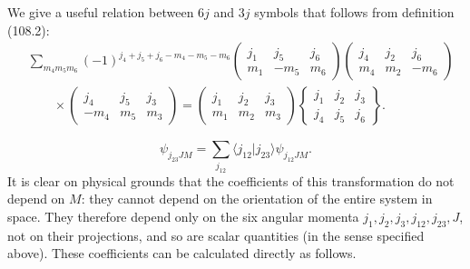 We give a useful relation between $6j$ and $3j$ symbols that follows from definition (108.2):
\begin{equation}
\begin{aligned}
&\sum_{m_4m_5m_6}(-1)^{j_4+j_5+j_6-m_4-m_5-m_6}
\begin{pmatrix}j_1&j_5&j_6\\m_1&-m_5&m_6\end{pmatrix}
\begin{pmatrix}j_4&j_2&j_6\\m_4&m_2&-m_6\end{pmatrix}\\
&\qquad\times\begin{pmatrix}j_4&j_5&j_3\\-m_4&m_5&m_3\end{pmatrix}
=\begin{pmatrix}j_1&j_2&j_3\\m_1&m_2&m_3\end{pmatrix}
\left\{\begin{matrix}j_1&j_2&j_3\\j_4&j_5&j_6\end{matrix}\right\}.
\end{aligned}
\tag{108.4}
\end{equation}





\begin{equation}
 \psi_{j_{23}JM}=\sum_{j_{12}}\langle j_{12}|j_{23}\rangle\psi_{j_{12}JM}.
 \tag{108.5}
\end{equation}
It is clear on physical grounds that the coefficients of this transformation do not depend on $M$: they cannot depend on the orientation of the entire system in space. They therefore depend only on the six angular momenta $j_1,j_2,j_3,j_{12},j_{23},J$, not on their projections, and so are scalar quantities (in the sense specified above). These coefficients can be calculated directly as follows.

